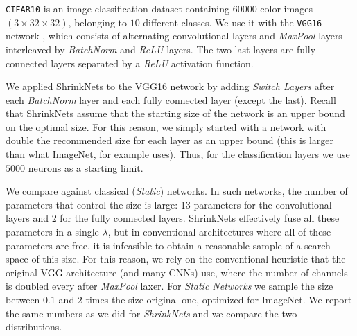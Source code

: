 \texttt{CIFAR10} is an image classification dataset containing $60000$ color
images $(3 \times 32 \times 32)$, belonging to $10$ different classes. We use it
with the \texttt{VGG16} network \cite{Srivastava2014}, which consists of
alternating convolutional layers and \textit{MaxPool} layers interleaved by
\textit{BatchNorm} \cite{DBLP:journals/corr/IoffeS15} and \textit{ReLU}
\cite{Nair2010}  layers.  The two last layers are fully connected layers
separated by a \textit{ReLU} activation function.


We applied ShrinkNets to the VGG16 network by adding \textit{Switch Layers}
after each \textit{BatchNorm} layer and each fully connected layer (except the
last).  Recall that ShrinkNets assume that the starting size of the network is
an upper bound on the optimal size. For this reason, we simply started with a
network with double the recommended size for each layer as an upper bound (this
is larger than what ImageNet, for example uses). Thus, for the classification
layers we use $5000$ neurons as a starting limit.

We compare against classical (\textit{Static}) networks. In such networks, the
number of parameters that control the size is large: 13 parameters for the
convolutional layers and $2$ for the fully connected layers. ShrinkNets
effectively fuse all these parameters in a single $\lambda$, but in conventional
architectures where all of these parameters are free, it is infeasible to obtain
a reasonable sample of a search space of this size. For this reason, we rely on
the conventional heuristic that the original VGG architecture (and many CNNs)
use, where the number of channels is doubled every after \textit{MaxPool} laxer.
For \textit{Static Networks} we sample the size between $0.1$ and $2$ times the size
original one, optimized for ImageNet. We report the same numbers as we did for
\textit{ShrinkNets} and we compare the two distributions.  

